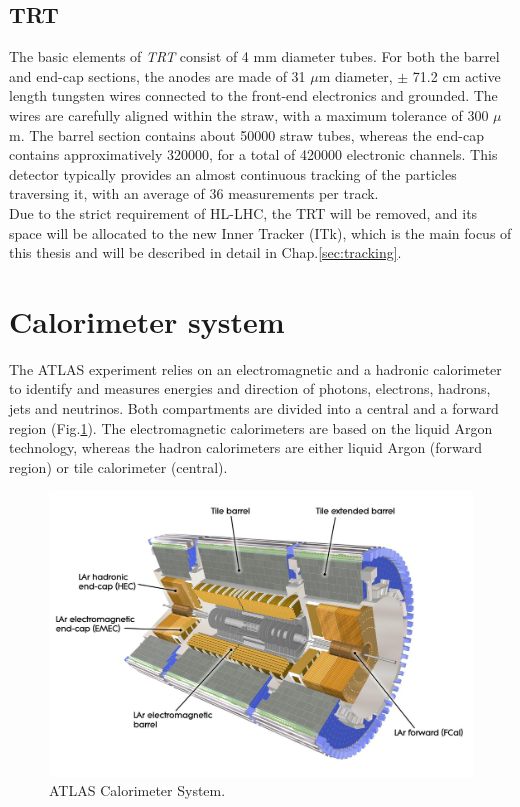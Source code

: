 \documentclass[a4paper,twoside,12pt]{book}
\begin{document}
\subsection*{TRT}
The basic elements of \textit{TRT} consist of 4 mm diameter tubes\cite{Aad:2008zzm}. For both the barrel
and end-cap sections, the anodes are made of 31 $\mu$m diameter, $\pm$ 71.2 cm 
active length tungsten wires 
connected to the front-end electronics and grounded. The wires are carefully aligned within
the straw, with a maximum tolerance of 300 $\mu$m. The barrel section contains about 
50000 straw tubes, whereas the end-cap contains approximatively 320000,
for a total of 420000 electronic channels\cite{ATLAS:1997ag}. This detector typically provides
an almost continuous tracking of the particles traversing it, with an average of 36 measurements per track.\\

Due to the strict requirement of HL-LHC, the TRT will be removed, and its space will be allocated to the new
Inner Tracker (ITk), which is the main focus of this thesis and will be described in detail in Chap.\ref{sec:tracking}.

\section{Calorimeter system}

The ATLAS experiment  relies on an electromagnetic and a hadronic calorimeter to identify and measures energies and direction of photons, electrons, hadrons, jets and neutrinos. 
Both compartments are divided into a central and a forward region (Fig.\ref{fig:current_Cals}). The electromagnetic calorimeters are based on the liquid Argon technology,
whereas the hadron calorimeters are either liquid Argon (forward region) or tile calorimeter (central).\\

\begin{figure} [h]
	\includegraphics[width=\textwidth]{current_Cals}
	\caption{ATLAS Calorimeter System.}
	\label{fig:current_Cals}
\end{figure}
\end{document}
